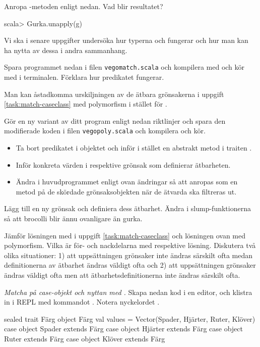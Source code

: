 \Subtask Anropa -metoden enligt nedan. Vad blir resultatet?
\begin{REPL}
scala> Gurka.unapply(g)   
\end{REPL}
Vi ska i senare uppgifter undersöka hur typerna  och  fungerar och hur man kan ha nytta av dessa i andra sammanhang.

\Subtask Spara programmet nedan i filen \texttt{vegomatch.scala} och kompilera med  och kör med  i terminalen. Förklara hur predikatet  fungerar. 



\Task Man kan åstadkomma urskiljningen av de ätbara grönsakerna i uppgift \ref{task:match-caseclass} med polymorfism i stället för . 

\Subtask Gör en ny variant av ditt program enligt nedan riktlinjer och spara den modifierade koden i filen \texttt{vegopoly.scala} och kompilera och kör.
\begin{itemize}[noitemsep]
\item Ta bort predikatet  i objektet  och inför i stället en abstrakt metod  i traiten .
\item Inför konkreta värden i respektive grönsak som definierar ätbarheten.
\item Ändra i huvudprogrammet enligt ovan ändringar så att  anropas som en metod på de skördade grönsaksobjekten när de ätvarda ska filtreras ut.
\end{itemize} 

\Subtask Lägg till en ny grönsak  och definiera dess ätbarhet. Ändra i slump-funktionerna så att brocolli blir ännu ovanligare än gurka.

\Subtask\Pen Jämför lösningen med  i uppgift \ref{task:match-caseclass} och lösningen ovan med polymorfism. Vilka är för- och nackdelarna med respektive lösning. Diskutera två olika situationer: 1) att uppsättningen grönsaker inte ändras särskilt ofta medan definitionerna av ätbarhet ändras väldigt ofta och 2) att uppsättningen grönsaker ändras väldigt ofta men att ätbarhetsdefinitionerna inte ändras särskilt ofta.



\Task \emph{Matcha på case-objekt och nyttan med .} Skapa nedan kod i en editor, och klistra in i REPL med kommandot . Notera nyckelordet .
\begin{Code}
sealed trait Färg
object Färg { 
  val values = Vector(Spader, Hjärter, Ruter, Klöver) 
}
case object Spader  extends Färg
case object Hjärter extends Färg
case object Ruter   extends Färg
case object Klöver  extends Färg
\end{Code}

